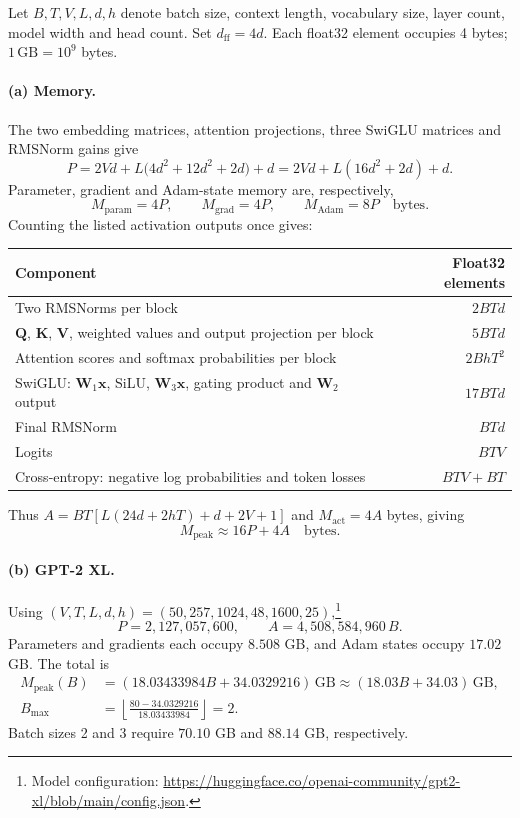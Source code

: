 \documentclass{article}
\begin{document}
Let $B,T,V,L,d,h$ denote batch size, context length, vocabulary size, layer count, model width and head count. Set $d_{\mathrm{ff}}=4d$. Each float32 element occupies 4 bytes; $1\,\mathrm{GB}=10^9$ bytes.

\paragraph{(a) Memory.}
The two embedding matrices, attention projections, three SwiGLU matrices and RMSNorm gains give
\[
P=2Vd+L\bigl(4d^2+12d^2+2d\bigr)+d=2Vd+L(16d^2+2d)+d.
\]
Parameter, gradient and Adam-state memory are, respectively,
\[
M_{\mathrm{param}}=4P,\qquad M_{\mathrm{grad}}=4P,\qquad M_{\mathrm{Adam}}=8P
\quad\text{bytes}.
\]
Counting the listed activation outputs once gives:
\begin{center}
\small
\begin{tabular}{@{}lr@{}}
\toprule
Component & Float32 elements \\
\midrule
Two RMSNorms per block & $2BTd$ \\
$\mathbf{Q}$, $\mathbf{K}$, $\mathbf{V}$, weighted values and output projection per block & $5BTd$ \\
Attention scores and softmax probabilities per block & $2BhT^2$ \\
SwiGLU: $\mathbf{W}_1\mathbf{x}$, SiLU, $\mathbf{W}_3\mathbf{x}$, gating product and $\mathbf{W}_2$ output & $17BTd$ \\
\midrule
Final RMSNorm & $BTd$ \\
Logits & $BTV$ \\
Cross-entropy: negative log probabilities and token losses & $BTV+BT$ \\
\bottomrule
\end{tabular}
\end{center}
Thus $A=BT[L(24d+2hT)+d+2V+1]$ and $M_{\mathrm{act}}=4A$ bytes, giving
\[
M_{\mathrm{peak}}\approx16P+4A\quad\text{bytes}.
\]

\paragraph{(b) GPT-2 XL.}
Using $(V,T,L,d,h)=(50{,}257,1024,48,1600,25)$,\footnote{Model configuration: \url{https://huggingface.co/openai-community/gpt2-xl/blob/main/config.json}.}
\[
P=2{,}127{,}057{,}600,\qquad A=4{,}508{,}584{,}960\,B.
\]
Parameters and gradients each occupy $8.508$ GB, and Adam states occupy $17.02$ GB. The total is
\begin{align*}
M_{\mathrm{peak}}(B)
 &= (18.03433984B+34.0329216)\,\mathrm{GB}\approx(18.03B+34.03)\,\mathrm{GB},\\
B_{\max}
 &=\left\lfloor\frac{80-34.0329216}{18.03433984}\right\rfloor
 =2.
\end{align*}
Batch sizes 2 and 3 require $70.10$ GB and $88.14$ GB, respectively.
\end{document}
